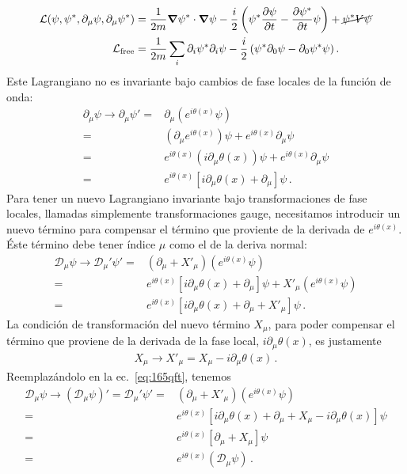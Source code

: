\begin{align}
  \mathcal{L}(\psi,\psi^*,\partial_\mu\psi,\partial_\mu\psi^*)&=\frac{1}{2m}\boldsymbol{\nabla}\psi^*\cdot\boldsymbol{\nabla}\psi-\frac{i}{2}
  \left(
\psi^*\frac{\partial\psi}{\partial t}-\frac{\partial\psi^*}{\partial t}\psi
  \right)+\cancel{\psi^*V\psi}\\
\mathcal{L}_{\text{free}}&=\frac{1}{2m}\sum_i\partial_i\psi^*\partial_i\psi-\frac{i}{2}
  \left(\psi^*\partial_0\psi-\partial_0\psi^*\psi\right).\nonumber
\end{align}
Este Lagrangiano no es invariante bajo cambios de fase locales de la función de onda:
\begin{align}
  \partial_\mu \psi\to\partial_\mu \psi'=&\partial_\mu \left(e^{i\theta(x)}\psi\right)\nonumber\\
  =&\left(\partial_\mu e^{i\theta(x)}\right)\psi+e^{i\theta(x)}\partial_\mu\psi\nonumber\\
  =&e^{i\theta(x)}\left(i\partial_\mu \theta(x)\right)\psi+e^{i\theta(x)}\partial_\mu\psi\nonumber\\
  =&e^{i\theta(x)}\left[i\partial_\mu \theta(x)+\partial_\mu\right]\psi\,.
\end{align}
Para tener un nuevo Lagrangiano invariante bajo transformaciones de fase locales, llamadas simplemente transformaciones gauge, necesitamos introducir un nuevo término para compensar el término que proviente de la derivada de  $e^{i\theta(x)}$. Éste término debe tener índice $\mu$ como el de la deriva normal:
\begin{align}
\label{eq:165qft}
   \mathcal{D}_\mu \psi\to\mathcal{D}_\mu' \psi'=&(\partial_\mu+X'_\mu) \left(e^{i\theta(x)}\psi\right)\nonumber\\
   =&e^{i\theta(x)}\left[i\partial_\mu \theta(x)+\partial_\mu\right]\psi+X'_\mu \left(e^{i\theta(x)}\psi\right)\nonumber\\
   =&e^{i\theta(x)}\left[i\partial_\mu \theta(x)+\partial_\mu+X'_\mu \right]\psi\,.
\end{align}
La condición de transformación del nuevo término $X_\mu$, para poder compensar el término que proviene de la derivada de la fase local,  $i\partial_\mu\theta(x)$, es justamente
\begin{align}
\label{eq:169qft}
X_\mu\to  X'_\mu=X_\mu-i\partial_\mu\theta(x)\,.
\end{align}
Reemplazándolo en la ec.~\eqref{eq:165qft}, tenemos
\begin{align}
    \mathcal{D}_\mu \psi\to\left(\mathcal{D}_\mu \psi\right)'=\mathcal{D}_\mu' \psi'=&(\partial_\mu+X'_\mu) \left(e^{i\theta(x)}\psi\right)\nonumber\\
=&e^{i\theta(x)}\left[i\partial_\mu \theta(x)+\partial_\mu+X_\mu-i\partial_\mu\theta(x) \right]\psi\nonumber\\
=&e^{i\theta(x)}\left[\partial_\mu+X_\mu\right]\psi\nonumber\\
=&e^{i\theta(x)}\left(\mathcal{D}_\mu\psi\right)\,.
\end{align}
